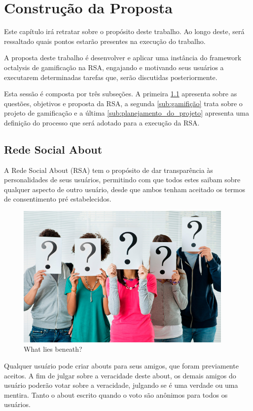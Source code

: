 \chapter[Construção da Proposta]{Construção da Proposta}

Este capítulo irá retratar sobre o propósito deste trabalho. Ao longo deste, será ressaltado quais
pontos estarão presentes na execução do trabalho.

A proposta deste trabalho é desenvolver e aplicar uma instância do framework octalysis de gamificação na RSA, engajando e
motivando seus usuários a executarem determinadas tarefas que, serão discutidas posteriormente.

Esta sessão é composta por três subseções. A primeira \ref{sub:redesocialabout} apresenta sobre
as questões, objetivos e proposta da RSA, a segunda \ref{sub:gamifição} trata
sobre o projeto de gamificação e a última \ref{sub:planejamento_do_projeto} apresenta uma definição
do processo que será adotado para a execução da RSA.

\section{Rede Social About}
\label{sub:redesocialabout}
A Rede Social About (RSA) tem o propósito de dar transparência às personalidades de seus usuários, permitindo com que todos
estes saibam sobre qualquer aspecto de outro usuário, desde que ambos tenham aceitado os
termos de consentimento pré estabelecidos.

\begin{figure}[h]
    \centering
    \includegraphics[width=400px, scale=1]{figuras/pessoas-duvida}
    \caption{What lies beneath?}
    \label{fig:pessoas-duvida}
\end{figure}

Qualquer usuário pode criar abouts para seus amigos, que foram previamente aceitos. A fim de julgar
sobre a veracidade deste about, os demais amigos do usuário poderão votar sobre a veracidade,
julgando se é uma verdade ou uma mentira. Tanto o about escrito quando o voto são anônimos para todos os
usuários.

